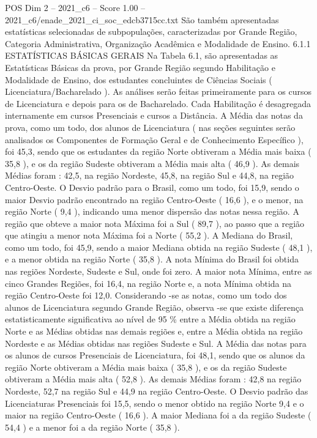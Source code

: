 \begin{textsample}{POS Dim 2 – 2021\_c6 – Score 1.00 – 2021\_c6/enade\_2021\_ci\_soc\_edcb3715cc.txt}
São também apresentadas estatísticas selecionadas de subpopulações, caracterizadas por Grande Região, Categoria Administrativa, Organização Acadêmica e Modalidade de Ensino. 6.1.1 ESTATÍSTICAS BÁSICAS GERAIS Na Tabela 6.1, são apresentadas as Estatísticas Básicas da prova, por Grande Região segundo Habilitação e Modalidade de Ensino, dos estudantes concluintes de Ciências Sociais ( Licenciatura/Bacharelado ).
As análises serão feitas primeiramente para os cursos de Licenciatura e depois para os de Bacharelado.
Cada Habilitação é desagregada internamente em cursos Presenciais e cursos a Distância.
A Média das notas da prova, como um todo, dos alunos de Licenciatura ( nas seções seguintes serão analisados os Componentes de Formação Geral e de Conhecimento Específico ), foi 45,3, sendo que os estudantes da região Norte obtiveram a Média mais baixa ( 35,8 ), e os da região Sudeste obtiveram a Média mais alta ( 46,9 ).
As demais Médias foram : 42,5, na região Nordeste, 45,8, na região Sul e 44,8, na região Centro-Oeste.
O Desvio padrão para o Brasil, como um todo, foi 15,9, sendo o maior Desvio padrão encontrado na região Centro-Oeste ( 16,6 ), e o menor, na região Norte ( 9,4 ), indicando uma menor dispersão das notas nessa região.
A região que obteve a maior nota Máxima foi a Sul ( 89,7 ), ao passo que a região que atingiu a menor nota Máxima foi a Norte ( 55,2 ).
A Mediana do Brasil, como um todo, foi 45,9, sendo a maior Mediana obtida na região Sudeste ( 48,1 ), e a menor obtida na região Norte ( 35,8 ).
A nota Mínima do Brasil foi obtida nas regiões Nordeste, Sudeste e Sul, onde foi zero.
A maior nota Mínima, entre as cinco Grandes Regiões, foi 16,4, na região Norte e, a nota Mínima obtida na região Centro-Oeste foi 12,0.
Considerando -se as notas, como um todo dos alunos de Licenciatura segundo Grande Região, observa -se que existe diferença estatisticamente significativa ao nível de 95 \% entre a Média obtida na região Norte e as Médias obtidas nas demais regiões e, entre a Média obtida na região Nordeste e as Médias obtidas nas regiões Sudeste e Sul.
A Média das notas para os alunos de cursos Presenciais de Licenciatura, foi 48,1, sendo que os alunos da região Norte obtiveram a Média mais baixa ( 35,8 ), e os da região Sudeste obtiveram a Média mais alta ( 52,8 ).
As demais Médias foram : 42,8 na região Nordeste, 52,7 na região Sul e 44,9 na região Centro-Oeste.
O Desvio padrão das Licenciaturas Presenciais foi 15,5, sendo o menor obtido na região Norte 9,4 e o maior na região Centro-Oeste ( 16,6 ).
A maior Mediana foi a da região Sudeste ( 54,4 ) e a menor foi a da região Norte ( 35,8 ).

\end{textsample}
